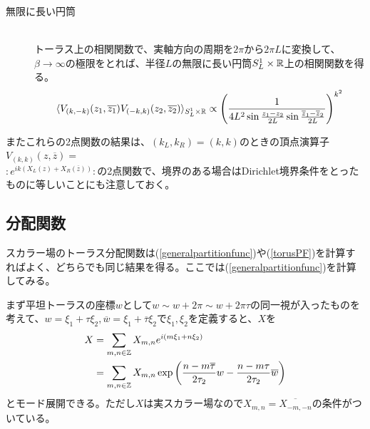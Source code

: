 \begin{ex}
\begin{oframed}
\begin{description}
	\item[無限に長い円筒] \hfill\\
	トーラス上の相関関数で、実軸方向の周期を$2\pi$から$2\pi L$に変換して、$\beta\to\infty$の極限をとれば、半径$L$の無限に長い円筒$S_L^1\times \mathbb{R}$上の相関関数を得る。
	\begin{align}
	\langle V_{(k,-k)}(z_1,\overline{z_1}) V_{(-k,k)}(z_2,\overline{z_2}) \rangle_{S_L^1\times \mathbb{R}} \propto \left(\frac{1}{4L^2\sin\frac{z_1-z_2}{2L}\sin\frac{\overline{z}_1-\overline{z}_2}{2L}}\right)^{k^2}
	\end{align}
\end{description}
\end{oframed}

またこれらの2点関数の結果は、$(k_L,k_R)=(k,k)$のときの頂点演算子$V_{(k,k)}(z,\overline{z})=$\\$\colon e^{ik (X_L(z)+ X_R(\overline{z}))}\colon $の2点関数で、境界のある場合はDirichlet境界条件をとったものに等しいことにも注意しておく。
\end{ex}

\subsection{分配関数}
スカラー場のトーラス分配関数は(\ref{generalpartitionfunc})や(\ref{torusPF})を計算すればよく、どちらでも同じ結果を得る。ここでは(\ref{generalpartitionfunc})を計算してみる。

まず平坦トーラスの座標$w$として$w\sim w+2\pi \sim w+2\pi\tau$の同一視が入ったものを考えて、$w=\xi_1+\tau\xi_2,\overline{w}=\xi_1+\overline{\tau}\xi_2$で$\xi_1,\xi_2$を定義すると、$X$を
\begin{align}
X&=\sum_{m,n\in\mathbb{Z}} X_{m,n}e^{i(m\xi_1+n\xi_2)}\\
&=\sum_{m,n\in\mathbb{Z}} X_{m,n}\exp\left( \frac{n-m\overline{\tau}}{2\tau_2}w-\frac{n-m\tau}{2\tau_2}\overline{w} \right)
\end{align}
とモード展開できる。ただし$X$は実スカラー場なので$X_{m,n}=\overline{X_{-m,-n}}$の条件がついている。

